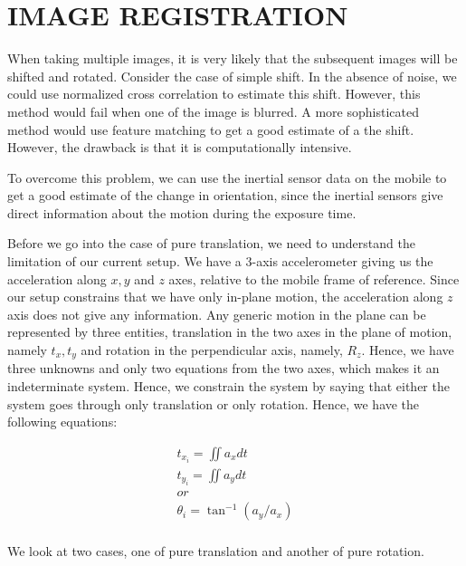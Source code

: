 \documentclass[BTech]{iitmdiss}
\begin{document}
\chapter{IMAGE REGISTRATION}
\label{chap:image_registration}
When taking multiple images, it is very likely that the subsequent 
images will be shifted and rotated. Consider the case of simple shift. 
In the absence of noise, we could use normalized cross correlation
to estimate this shift. However, this method would fail when one of the 
image is blurred. A more sophisticated method would use feature matching
to get a good estimate of a the shift. However, the drawback is that it
is computationally intensive.

To overcome this problem, we can use the inertial sensor data on the 
mobile to get a good estimate of the change in orientation, since the 
inertial sensors give direct information about the motion during the 
exposure time. 

Before we go into the case of pure translation, we need to understand 
the limitation of our current setup. We have a 3-axis accelerometer 
giving us the acceleration along ${x, y}$ and $z$ axes, relative to
the mobile frame of reference. Since our setup constrains that we have
only in-plane motion, the acceleration along $z$ axis does not give 
any information. Any generic motion in the plane can be represented by
three entities, translation in the two axes in the plane of motion, namely ${t_x, t_y}$ and rotation in the perpendicular axis, namely, $R_z$. Hence, we have three unknowns and only two equations from the two axes, which makes it an 
indeterminate system. Hence, we constrain the system by saying that
either the system goes through only translation or only rotation. Hence,
we have the following equations:

\begin{align*}
t_{x_i}=\iint{a_x}dt\\
t_{y_i}=\iint{a_y}dt\\
or\\
{\theta}_i=\tan^{-1}({a_y}/{a_x})\\
\end{align*}

We look at two cases, one of pure translation and another of pure 
rotation.
\end{document}
